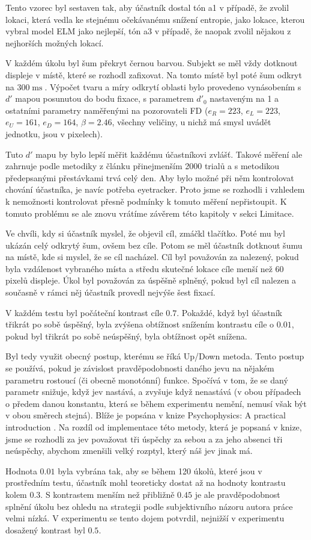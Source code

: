 Tento vzorec byl sestaven tak, aby účastník dostal tón a1 v případě, že zvolil
lokaci, která vedla ke stejnému očekávanému snížení entropie, jako lokace,
kterou vybral model ELM jako nejlepší, tón a3 v případě, že naopak zvolil
nějakou z nejhorších možných lokací.

V každém úkolu byl šum překryt černou barvou. Subjekt se měl vždy dotknout
displeje v místě, které se rozhodl zafixovat. Na tomto místě byl poté šum
odkryt na $300 \operatorname{ms}$. Výpočet tvaru a míry odkrytí oblasti bylo
provedeno vynásobením s $d'$ mapou posunutou do bodu fixace, s parametrem
$d'_0$ nastaveným na 1 a ostatními parametry naměřenými na pozorovateli FD
($e_R=223$, $e_L=223$, $e_U = 161$, $e_D = 164$, $\beta=2.46$, všechny
veličiny, u nichž má smysl uvádět jednotku, jsou v pixelech).

Tuto $d'$ mapu by bylo lepší měřit každému účastníkovi
zvlášť. Takové měření ale zahrnuje podle metodiky z článku \citep{Ellipse}
přinejmenším 2000 trialů a s metodikou předepsanými přestávkami trvá celý den.
Aby bylo možné při něm kontrolovat chování účastníka, je navíc potřeba
eyetracker. Proto jsme se rozhodli i vzhledem k nemožnosti kontrolovat přesně
podmínky k tomuto měření nepřistoupit. K tomuto problému se ale znovu vrátíme
závěrem této kapitoly v sekci Limitace.  

Ve chvíli, kdy si účastník myslel, že objevil cíl, zmáčkl tlačítko. Poté mu byl
ukázán celý odkrytý šum, ovšem bez cíle. Potom se měl účastník dotknout šumu na
místě, kde si myslel, že se cíl nacházel. Cíl byl považován za nalezený, pokud
byla vzdálenost vybraného místa a středu skutečné lokace cíle menší než 60
pixelů displeje. Úkol byl považován za úspěšně splněný, pokud byl cíl nalezen a
současně v rámci něj účastník provedl nejvýše šest fixací. 

V každém testu byl počáteční kontrast cíle $0.7$. Pokaždé, když byl účastník
třikrát po sobě úspěšný, byla zvýšena obtížnost snížením kontrastu cíle o
$0.01$, pokud byl třikrát po sobě neúspěšný, byla obtížnost opět snížena. 

Byl tedy využit obecný postup, kterému se říká Up/Down metoda. Tento postup se
používá, pokud je závislost pravděpodobnosti daného jevu na nějakém parametru
rostoucí (či obecně monotónní) funkce. Spočívá v tom, že se daný parametr
snižuje, když jev nastává, a zvyšuje když nenastává (v obou případech o předem
danou konstantu, která se během experimentu nemění, nemusí však být v obou
směrech stejná). Blíže je popsána v knize Psychophysics: A practical
introduction \citep{psychophysics}.  Na rozdíl od implementace této metody,
která je popsaná v knize, jsme se rozhodli za jev považovat tři úspěchy za
sebou a za jeho absenci tři neúspěchy, abychom zmenšili velký rozptyl, který
náš jev jinak má.

Hodnota $0.01$ byla vybrána tak, aby se během 120 úkolů, které jsou v
prostředním testu, účastník mohl teoreticky dostat až na hodnoty kontrastu
kolem $0.3$. S kontrastem menším než přibližně $0.45$ je ale pravděpodobnost
splnění úkolu bez ohledu na strategii podle subjektivního názoru autora práce
velmi nízká. V experimentu se tento dojem potvrdil, nejnižší v experimentu
dosažený kontrast byl $0.5$.




